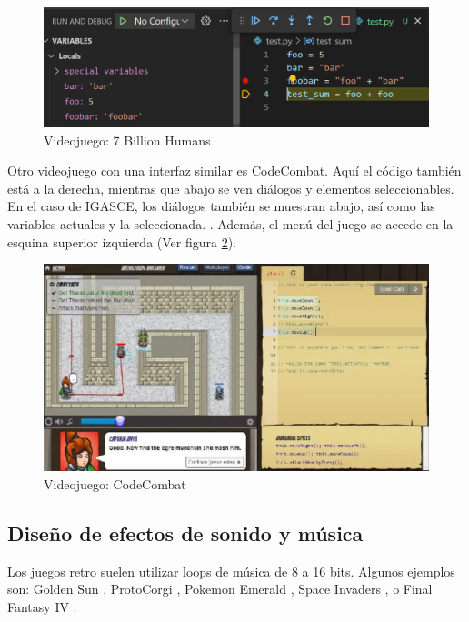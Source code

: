 \begin{figure}[h]
	\centering
	\includegraphics[scale=0.3]{imagenes/VScodeDebugger.png}
	\caption{Videojuego: 7 Billion Humans}
	\label{7BillionHumans}
\end{figure}


Otro videojuego con una interfaz similar es CodeCombat. Aquí el código también está a la derecha, mientras que abajo se ven diálogos y elementos seleccionables. En el caso de IGASCE, los diálogos también se muestran abajo, así como las variables actuales y la seleccionada.
\cite{CodeCombat}. Además, el menú del juego se accede en la esquina superior izquierda (Ver figura \ref{CodeCombat}).

\begin{figure}[h]
	\centering
	\includegraphics[scale=0.3]{imagenes/CodeCombat.png}
	\caption{Videojuego: CodeCombat}
	\label{CodeCombat}
\end{figure}


\subsection{Diseño de efectos de sonido y música}

Los juegos retro suelen utilizar loops de música de 8 a 16 bits. Algunos ejemplos son: Golden Sun \cite{Wiki_Golden_Sun}, ProtoCorgi \cite{ProtoCorgi}, Pokemon Emerald \cite{PokemonEmerald}, Space Invaders \cite{SpaceInvaders}, o Final Fantasy IV \cite{FinalFantasyIV}.

